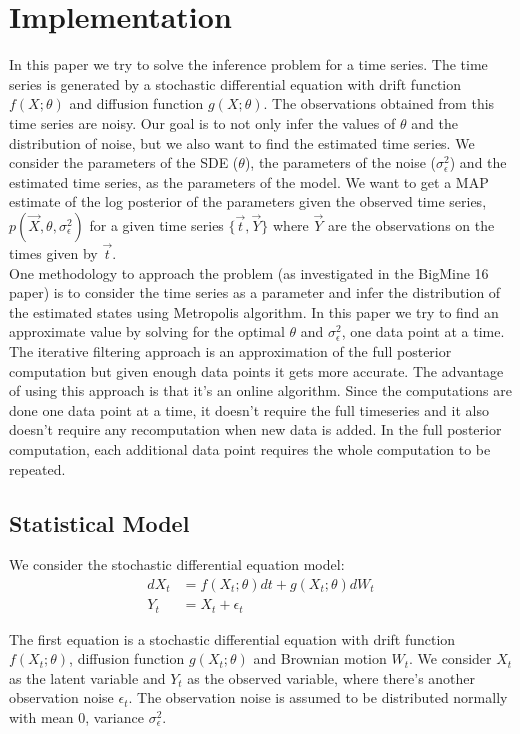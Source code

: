 \documentclass[a4paper,11pt]{article}
\begin{document}
\section{Implementation}

In this paper we try to solve the inference problem for a time series. The time series is generated by a stochastic differential equation with drift function $f(X; \theta)$ and diffusion function $g(X; \theta)$. The observations obtained from this time series are noisy. Our goal is to not only infer the values of $\theta$ and the distribution of noise, but we also want to find the estimated time series. We consider the parameters of the SDE ($\theta$), the parameters of the noise ($\sigma^2_{\epsilon}$) and the estimated time series, as the parameters of the model. We want to get a MAP estimate of the log posterior of the parameters given the observed time series, $p(\vec{X}, \theta, \sigma^2_{\epsilon})$ for a given time series $\{ \vec{t}, \vec{Y} \}$ where $\vec{Y}$ are the observations on the times given by $\vec{t}$. \\ One methodology to approach the problem (as investigated in the BigMine 16 paper) is to consider the time series as a parameter and infer the distribution of the estimated states using Metropolis algorithm. In this paper we try to find an approximate value by solving for the optimal $\theta$ and $\sigma^2_{\epsilon}$, one data point at a time. The iterative filtering approach is an approximation of the full posterior computation but given enough data points it gets more accurate. The advantage of using this approach is that it's an online algorithm. Since the computations are done one data point at a time, it doesn't require the full timeseries and it also doesn't require any recomputation when new data is added. In the full posterior computation, each additional data point requires the whole computation to be repeated. \\

\subsection{Statistical Model}
We consider the stochastic differential equation model:
\begin{align*}
d X_t & = f(X_t; \theta) dt + g(X_t ; \theta) dW_t \\
Y_t & = X_t + \epsilon_t
\end{align*}

The first equation is a stochastic differential equation with drift function $f(X_t; \theta)$, diffusion function $g(X_t; \theta)$ and Brownian motion $W_t$. We consider $X_t$ as the latent variable and $Y_t$ as the observed variable, where there's another observation noise $\epsilon_t$. The observation noise is assumed to be distributed normally with mean 0, variance $\sigma^2_{\epsilon}$. \\
\end{document}
